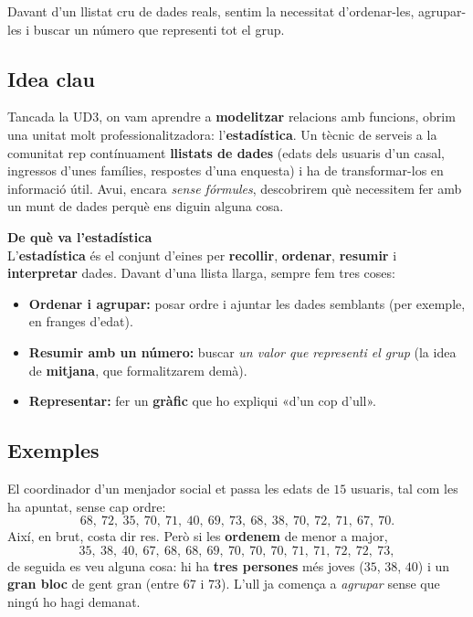 %
{Davant d'un llistat cru de dades reals, sentim la necessitat d'ordenar-les, agrupar-les i buscar un número que representi tot el grup.}

\subsection{Idea clau}

Tancada la UD3, on vam aprendre a \textbf{modelitzar} relacions amb funcions, obrim
una unitat molt professionalitzadora: l'\textbf{estadística}. Un tècnic de serveis a
la comunitat rep contínuament \textbf{llistats de dades} (edats dels usuaris d'un
casal, ingressos d'unes famílies, respostes d'una enquesta) i ha de transformar-los
en informació útil. Avui, encara \emph{sense fórmules}, descobrirem què necessitem
fer amb un munt de dades perquè ens diguin alguna cosa.

\begin{idea}
\textbf{De què va l'estadística}\\
L'\textbf{estadística} és el conjunt d'eines per \textbf{recollir}, \textbf{ordenar},
\textbf{resumir} i \textbf{interpretar} dades. Davant d'una llista llarga, sempre fem
tres coses:
\begin{itemize}[leftmargin=1.4em, itemsep=2pt]
  \item \textbf{Ordenar i agrupar:} posar ordre i ajuntar les dades semblants (per
        exemple, en franges d'edat).
  \item \textbf{Resumir amb un número:} buscar \emph{un valor que representi el grup}
        (la idea de \textbf{mitjana}, que formalitzarem demà).
  \item \textbf{Representar:} fer un \textbf{gràfic} que ho expliqui «d'un cop d'ull».
\end{itemize}
\end{idea}

\subsection{Exemples}

\begin{exemple}
El coordinador d'un menjador social et passa les edats de $15$ usuaris, tal com les
ha apuntat, sense cap ordre:
\[
68,\ 72,\ 35,\ 70,\ 71,\ 40,\ 69,\ 73,\ 68,\ 38,\ 70,\ 72,\ 71,\ 67,\ 70.
\]
Així, en brut, costa dir res. Però si les \textbf{ordenem} de menor a major,
\[
35,\ 38,\ 40,\ 67,\ 68,\ 68,\ 69,\ 70,\ 70,\ 70,\ 71,\ 71,\ 72,\ 72,\ 73,
\]
de seguida es veu alguna cosa: hi ha \textbf{tres persones} més joves ($35$, $38$,
$40$) i un \textbf{gran bloc} de gent gran (entre $67$ i $73$). L'ull ja comença a
\emph{agrupar} sense que ningú ho hagi demanat.
\end{exemple}

